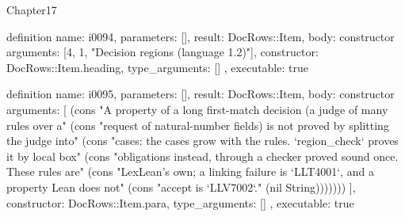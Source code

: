 \begin{lexlean}{Chapter17}
\begin{semanticmodule}
definition{
  name: i0094,
  parameters: [],
  result: DocRows::Item,
  body: constructor{
    arguments: [4, 1, "Decision regions (language 1.2)"],
    constructor: DocRows::Item.heading,
    type_arguments: []
  },
  executable: true
}

definition{
  name: i0095,
  parameters: [],
  result: DocRows::Item,
  body: constructor{
    arguments: [
      (cons "A property of a long first-match decision (a judge of many rules over a" (cons "request of natural-number fields) is not proved by splitting the judge into" (cons "cases: the cases grow with the rules. `region_check` proves it by local box" (cons "obligations instead, through a checker proved sound once. These rules are" (cons "LexLean's own; a linking failure is `LLT4001`, and a property Lean does not" (cons "accept is `LLV7002`." (nil String)))))))
    ],
    constructor: DocRows::Item.para,
    type_arguments: []
  },
  executable: true
}


\end{semanticmodule}
\end{lexlean}
